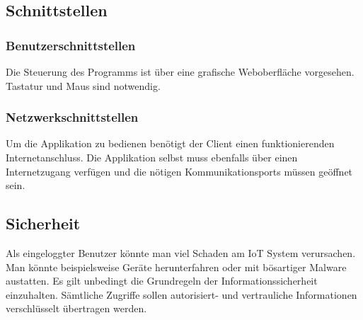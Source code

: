 \subsection{Schnittstellen}
\subsubsection{Benutzerschnittstellen}
Die Steuerung des Programms ist über eine grafische Weboberfläche vorgesehen. Tastatur und Maus sind notwendig.
\subsubsection{Netzwerkschnittstellen}
Um die Applikation zu bedienen benötigt der Client einen funktionierenden Internetanschluss. Die Applikation selbst muss ebenfalls über einen Internetzugang verfügen und die nötigen Kommunikationsports müssen geöffnet sein.
\subsection{Sicherheit}
Als eingeloggter Benutzer könnte man viel Schaden am IoT System verursachen. Man könnte beispielsweise Geräte herunterfahren oder mit bösartiger Malware austatten. Es gilt unbedingt die Grundregeln der Informationssicherheit einzuhalten. Sämtliche Zugriffe sollen autorisiert- und vertrauliche Informationen verschlüsselt übertragen werden.